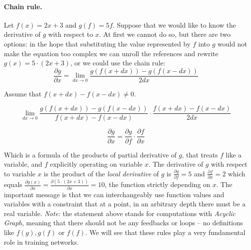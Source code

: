 \paragraph{Chain rule.}
Let $f(x)=2x+3$ and $g(f)=5f$. Suppose that we would like to know the derivative of $g$ with respect to $x$.
At first we cannot do so, but there are two options: in the hope that substituting the value represented by $f$ into $g$ would not make the equation too complex we can unroll the references and rewrite $g(x)=5\cdot(2x + 3)$, or we could use the chain rule:
$$
    \frac{\partial g}{\partial x} = \lim_{dx \rightarrow 0} \frac{g(f(x+dx)) - g(f(x-dx))}{2dx}
$$

\begin{center}
    Assume that $f(x+dx)-f(x-dx) \neq 0$.
\end{center}

$$
    \lim_{dx \rightarrow 0} \frac{g(f(x+dx)) - g(f(x-dx) ) }{f(x+dx)-f(x-dx)} \cdot \frac{f(x+dx)-f(x-dx)}{2dx}
$$

\begin{equation}\label{eq:chain}
    \frac{\partial g}{\partial x} = \frac{\partial g}{\partial f} \cdot \frac{\partial f}{\partial x}
\end{equation}

Which is a formula of the products of partial derivative of $g$, that treats $f$ like a variable, and $f$ explicitly operating on variable $x$.
The derivative of $g$ with respect to variable $x$ is the product of the \emph{local derivative} of $g$ is $\frac{\partial g}{\partial f}=5$ and $\frac{\partial f}{\partial x}=2$ which equals $\frac{\partial g(x)}{\partial x}=\frac{\partial(5\cdot (2x + 3))}{\partial x} = 10$, the function strictly depending on $x$.
The important message is that we can interchangeably use function values and variables with a constraint that at a point, in an arbitrary depth there must be a real variable.
\emph{Note:} the statement above stands for computations with \emph{Acyclic Graph}, meaning that there should not be any feedbacks or loops -- no definitions like $f(g), g(f)$ or $f(f)$.
We will see that these rules play a very fundamental role in training networks.

